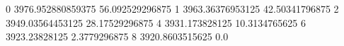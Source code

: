 0 3976.952880859375 56.092529296875
1 3963.36376953125 42.50341796875
2 3949.03564453125 28.17529296875
4 3931.173828125 10.3134765625
6 3923.23828125 2.3779296875
8 3920.8603515625 0.0
